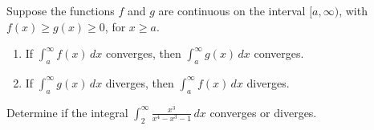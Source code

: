 \documentclass[../mathNotesPreamble]{subfiles}
\begin{document}
    \begin{thmBox*}
      Suppose the functions $f$ and $g$ are continuous on the interval $[a,\infty)$, with\newline $f(x)\geq g(x)\geq 0$, for $x\geq a$.
      \begin{enumerate}
        \item If $\displaystyle \int_a^\infty f(x)\,dx$ converges, then $\int_a^\infty g(x)\,dx$ converges.
        \item If $\displaystyle \int_a^\infty g(x)\,dx$ diverges, then $\int_a^\infty f(x)\,dx$ diverges.
      \end{enumerate}
    \end{thmBox*}

    \begin{ex*}
      Determine if the integral $\displaystyle \int_2^\infty \frac{x^3}{x^4-x^3-1}\,dx$ converges or diverges.
    \end{ex*}
    \pagebreak
\end{document}
